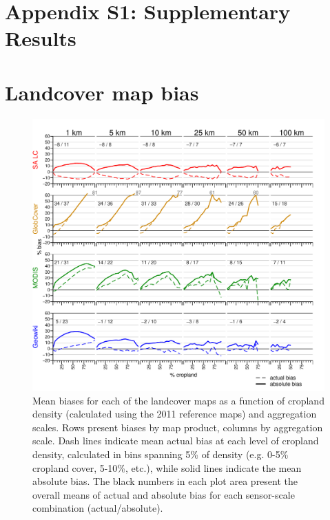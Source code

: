 \documentclass[12pt]{iopart}
\begin{document}


\setpagewiselinenumbers
\section*{\large Appendix S1: Supplementary Results}
\section*{Landcover map bias}

\begin{figure}[ht]
  \centering
     \includegraphics[width = 16cm]{figures/biases_1-100km.pdf} 
      \caption{Mean biases for each of the landcover maps as a function of cropland density (calculated using the 2011 reference maps) and aggregation scales. Rows present biases by map product, columns by aggregation scale.  Dash lines indicate mean actual bias at each level of cropland density, calculated in bins spanning 5\% of density (e.g. 0-5\% cropland cover, 5-10\%, etc.), while solid lines indicate the mean absolute bias.  The black numbers in each plot area present the overall means of actual and absolute bias for each sensor-scale combination (actual/absolute). }
      \label{fig:default}
\end{figure}
\end{document}
